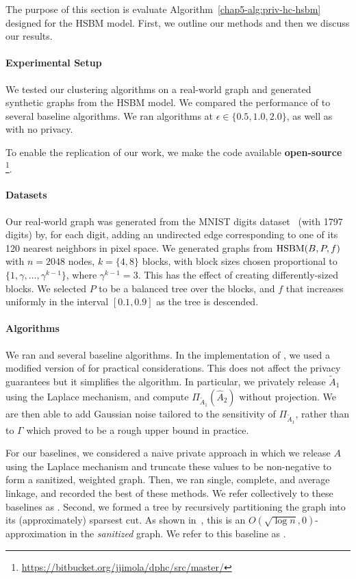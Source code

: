 The purpose of this section is evaluate Algorithm~\ref{chap5-alg:priv-hc-hsbm} designed for the HSBM model. First, we outline our methods and then we discuss our results.

\paragraph{Experimental Setup}
We tested our clustering algorithms on a real-world graph and generated synthetic graphs from the HSBM model. We compared the performance of \dphchsbm{} to several baseline algorithms.
We ran algorithms at $\epsilon \in \{0.5, 1.0, 2.0\}$, as well as with no privacy.

To enable the replication of our work, we make the code available {\bf open-source} \footnote{\url{https://bitbucket.org/jjimola/dphc/src/master/}}.

\paragraph{Datasets} Our real-world graph was generated from the MNIST digits dataset~\citep{lecun1998mnist} (with 1797 digits) by, for each digit, adding an undirected edge corresponding to one of its 120 nearest neighbors in pixel space. We generated graphs from $\textnormal{HSBM}(B, P, f)$ with $n=2048$ nodes, $k = \{4, 8\}$ blocks, with block sizes chosen proportional to $\{1, \gamma, \ldots, \gamma^{k-1}\}$, where $\gamma^{k-1} = 3$. This has the effect of creating differently-sized blocks. We selected $P$ to be a balanced tree over the blocks, and $f$ that increases uniformly in the interval $[0.1, 0.9]$ as the tree is descended. 

\paragraph{Algorithms} We ran \dphchsbm{} and several baseline algorithms. In the implementation of \dphchsbm{}, we used a modified version of \dpcom{} for practical considerations. This does not affect the privacy guarantees but it simplifies the algorithm. In particular, we privately release $\tilde{A}_1$ using the Laplace mechanism, and compute $\Pi_{\tilde{A}_1}(\hat{A}_2)$ without projection. We are then able to add Gaussian noise tailored to the sensitivity of $\Pi_{\tilde{A}_1}$, rather than to $\Gamma$ which proved to be a rough upper bound in practice.

For our baselines, we considered a naive private approach in which we release $A$ using the Laplace mechanism and truncate these values to be non-negative to form a sanitized, weighted graph. Then, we ran single, complete, and average linkage, and recorded the best of these methods. We refer collectively to these baselines as \linkage{}. Second, we formed a tree by recursively partitioning the graph into its (approximately) sparsest cut. As shown in~\citet{charikar2017approximate}, this is an $O(\sqrt{\log n}, 0)$-approximation in the \textit{sanitized} graph. We refer to this baseline as \sparsecut{}.

